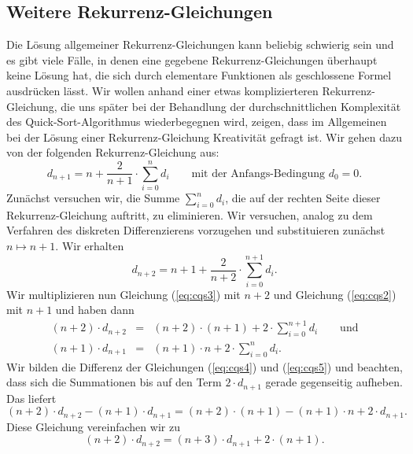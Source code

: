 \subsection{Weitere Rekurrenz-Gleichungen}
Die L\"{o}sung allgemeiner Rekurrenz-Gleichungen kann beliebig schwierig sein und
es gibt viele F\"{a}lle, in denen eine gegebene Rekurrenz-Gleichungen \"{u}berhaupt keine L\"{o}sung
hat, die sich durch elementare Funktionen als geschlossene Formel ausdr\"{u}cken l\"{a}sst.
Wir wollen anhand einer etwas komplizierteren Rekurrenz-Gleichung, die uns sp\"{a}ter bei der Behandlung der
durchschnittlichen Komplexit\"{a}t des Quick-Sort-Algorithmus wiederbegegnen wird, zeigen, dass im Allgemeinen bei
der L\"{o}sung einer Rekurrenz-Gleichung Kreativit\"{a}t gefragt ist.
Wir gehen dazu von der folgenden  Rekurrenz-Gleichung aus:
\begin{equation}
  \label{eq:cqs2}
  d_{n+1} = n + \frac{2}{n+1} \cdot \sum_{i=0}^n d_i \qquad \mbox{mit der Anfangs-Bedingung $d_0 = 0$}.   
\end{equation}
Zun\"{a}chst versuchen wir, die Summe $\sum_{i=0}^n d_i$, die auf der rechten Seite dieser Rekurrenz-Gleichung
auftritt, zu eliminieren.  Wir versuchen, analog zu dem Verfahren des diskreten Differenzierens vorzugehen
und substituieren zun\"{a}chst $n \mapsto n+1$.  Wir erhalten 
\begin{equation}
  \label{eq:cqs3}
   d_{n+2} = n+1 + \frac{2}{n+2} \cdot \sum_{i=0}^{n+1} d_i.  
\end{equation}
Wir multiplizieren nun Gleichung (\ref{eq:cqs3}) mit $n+2$ und Gleichung (\ref{eq:cqs2}) mit $n+1$ und
haben dann
\begin{eqnarray}
  \label{eq:cqs4}
 (n+2)\cdot d_{n+2} & = & (n+2)\cdot(n+1) + 2 \cdot \sum_{i=0}^{n+1} d_i \qquad \mbox{und} \\
  \label{eq:cqs5}
 (n+1)\cdot d_{n+1} & = & (n+1)\cdot n + 2 \cdot \sum_{i=0}^n d_i.  
\end{eqnarray}
Wir bilden die Differenz der Gleichungen (\ref{eq:cqs4}) und (\ref{eq:cqs5}) und beachten,
dass sich die Summationen bis auf den Term $2\cdot d_{n+1}$ gerade gegenseitig aufheben.
Das liefert
\begin{equation}
  \label{eq:cqs6}
 (n+2)\cdot d_{n+2} - (n+1)\cdot \displaystyle d_{n+1} = (n+2)\cdot(n+1) - (n+1)\cdot n+2 \cdot d_{n+1}.
\end{equation}
Diese Gleichung vereinfachen wir zu
\begin{equation}
  \label{eq:cqs7}
(n+2)\cdot d_{n+2} = (n+3)\cdot \displaystyle d_{n+1} + 2\cdot(n+1).  
\end{equation}

